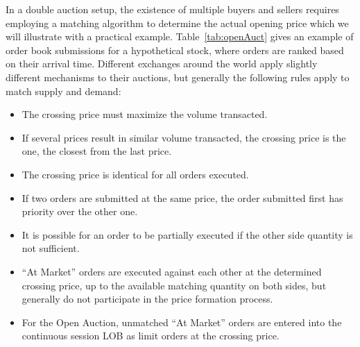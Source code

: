 In a double auction setup, the existence of multiple buyers and sellers requires employing a matching algorithm to determine the actual opening price which we will illustrate with a practical example. Table~\ref{tab:openAuct} gives an example of order book submissions for a hypothetical stock, where orders are ranked based on their arrival time. Different exchanges around the world apply slightly different mechanisms to their auctions, but generally the following rules apply to match supply and demand:
        \begin{itemize}
        \item The crossing price must maximize the volume transacted.
        \item If several prices result in similar volume transacted, the crossing price is the one, the closest from the last price. 
        \item The crossing price is identical for all orders executed.
        \item If two orders are submitted at the same price, the order submitted first has priority over the other one.
        \item It is possible for an order to be partially executed if the other side quantity is not sufficient.
        \item ``At Market'' orders are executed against each other at the determined crossing price, up to the available matching quantity on both sides, but generally do not participate in the price formation process.
        \item For the Open Auction, unmatched ``At Market'' orders are entered into the continuous session LOB as limit orders at the crossing price.
        \end{itemize} 


